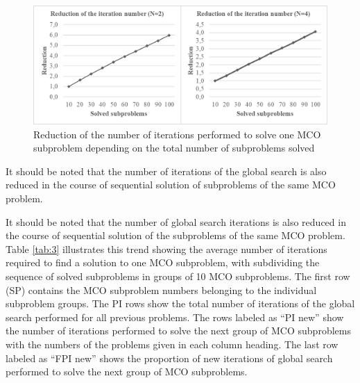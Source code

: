 \documentclass[smallextended]{svjour3}       %
\begin{document}
\begin{figure}
  \centering
  \includegraphics[width=1\linewidth]{fig5}
  \caption{Reduction of the number of iterations performed to solve one MCO subproblem depending on the total number of subproblems solved}
  \label{fig:5}
\end{figure}

It should be noted that the number of iterations of the global search is also reduced in the course of sequential solution of subproblems of the same MCO problem.

It should be noted that the number of global search iterations is also reduced in the course of sequential solution of the subproblems of the same MCO problem. Table \ref{tab:3} illustrates this trend showing the average number of iterations required to find a solution to one MCO subproblem, with subdividing the sequence of solved subproblems in groups of 10 MCO subproblems. The first row (SP) contains the MCO subproblem numbers belonging to the individual subproblem groups. The PI rows show the total number of iterations of the global search performed for all previous problems. The rows labeled as ``PI new'' show the number of iterations performed to solve the next group of MCO subproblems with the numbers of the problems given in each column heading. The last row labeled as ``FPI new'' shows the proportion of new iterations of global search performed to solve the next group of MCO subproblems.
\end{document}
